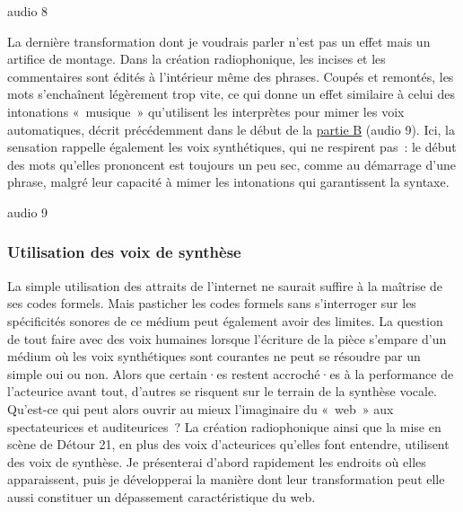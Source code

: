 \documentclass[
]{article}
\begin{document}
\label{audio-7}

audio 8

\label{audio-8}

La dernière transformation dont je voudrais parler n'est pas un effet mais un artifice de montage. Dans la création radiophonique, les incises et les commentaires sont édités à l'intérieur même des phrases. Coupés et remontés, les mots s'enchaînent légèrement trop vite, ce qui donne un effet similaire à celui des intonations «~musique~» qu'utilisent les interprètes pour mimer les voix automatiques, décrit précédemment dans le début de la \hyperref[acoustique-ou-amplifiuxe9-les-micros-et-la-voix]{partie B} (audio 9). Ici, la sensation rappelle également les voix synthétiques, qui ne respirent pas~: le début des mots qu'elles prononcent est toujours un peu sec, comme au démarrage d'une phrase, malgré leur capacité à mimer les intonations qui garantissent la syntaxe.

audio 9

\label{audio-9}

\subsubsection{Utilisation des voix de synthèse}\label{utilisation-des-voix-de-synthuxe8se}

La simple utilisation des attraits de l'internet ne saurait suffire à la maîtrise de ses codes formels. Mais pasticher les codes formels sans s'interroger sur les spécificités sonores de ce médium peut également avoir des limites. La question de tout faire avec des voix humaines lorsque l'écriture de la pièce s'empare d'un médium où les voix synthétiques sont courantes ne peut se résoudre par un simple oui ou non. Alors que certain·es restent accroché·es à la performance de l'acteurice avant tout, d'autres se risquent sur le terrain de la synthèse vocale. Qu'est-ce qui peut alors ouvrir au mieux l'imaginaire du «~web~» aux spectateurices et auditeurices~? La création radiophonique ainsi que la mise en scène de Détour 21, en plus des voix d'acteurices qu'elles font entendre, utilisent des voix de synthèse. Je présenterai d'abord rapidement les endroits où elles apparaissent, puis je développerai la manière dont leur transformation peut elle aussi constituer un dépassement caractéristique du web.
\end{document}
